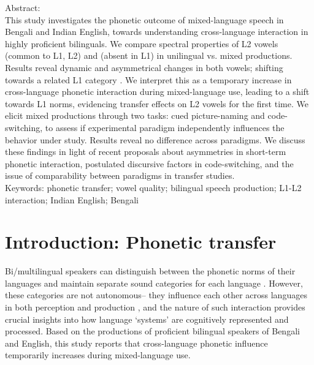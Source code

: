 \documentclass[12 pt]{article}
\newcommand{\nt}[1]{\textipa{[#1]}} %
\newlength\mystoreparindent
\newenvironment{myparindent}[1]{%
	\setlength{\mystoreparindent}{\the\parindent}
	\setlength{\parindent}{#1}
}{%
	\setlength{\parindent}{\mystoreparindent}
}
\begin{document}
\newpage
\begin{myparindent}{0pt}
Abstract:\\
This study investigates the phonetic outcome of mixed-language speech in Bengali and Indian English, towards understanding cross-language interaction in highly proficient bilinguals.  We compare spectral properties of L2 vowels \nt{\ae} (common to L1, L2) and \nt{2} (absent in L1) in unilingual vs. mixed productions. Results reveal dynamic and asymmetrical changes in both vowels;  \nt{2} shifting towards a related L1 category \nt{a:}. We interpret this as a temporary increase in cross-language phonetic interaction during mixed-language use, leading to a shift towards L1 norms, evidencing transfer effects on L2 vowels for the first time. We elicit mixed productions through two tasks: cued picture-naming and code-switching, to assess if experimental paradigm independently influences the behavior under study. Results reveal no difference across paradigms. We discuss these findings in light of recent proposals about asymmetries in short-term phonetic interaction, postulated discursive factors in code-switching, and the issue of comparability between paradigms in transfer studies.\\


Keywords: phonetic transfer; vowel quality; bilingual speech production; L1-L2 interaction; Indian English; Bengali 

\end{myparindent}

\newpage

\section{Introduction: Phonetic transfer}

Bi/multilingual speakers can distinguish between the phonetic norms of their languages and maintain separate sound categories for each language \citep{caramazza1973acquisition,macleod2010impact,bosch2003simultaneous}. However, these categories are not autonomous-- they influence each other across languages in both perception and production \citep[e.g.][]{flege1995second,fowler2008cross,flege2002assessing}, and the nature of such interaction provides crucial insights into how language `systems' are cognitively represented and processed. Based on the productions of proficient bilingual speakers of Bengali and English, this study reports that cross-language phonetic influence temporarily increases during mixed-language use.%
\end{document}
